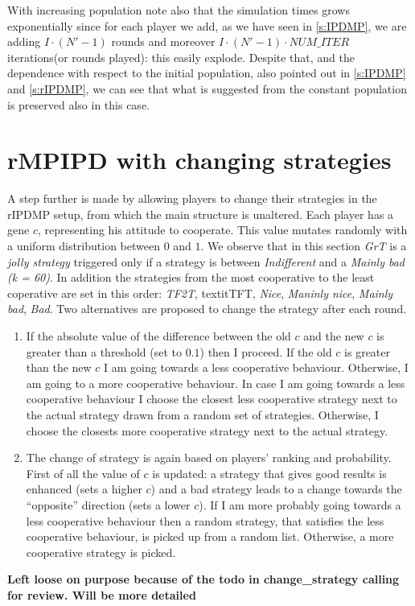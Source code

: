 \documentclass[journal,a4paper,10pt,twoside]{IEEEtran} %
\begin{document}
With increasing population note also that the simulation times grows exponentially since for each player we add, as we have seen in \autoref{s:IPDMP}, we are adding $I\cdot(N'-1)$ rounds and moreover $I\cdot(N'-1)\cdot{NUM\_ITER}$ iterations(or rounds played): this easily explode. Despite that, and the dependence with respect to the initial population, also pointed out in \autoref{s:IPDMP} and \autoref{s:rIPDMP}, we can see that what is suggested from the constant population is preserved also in this case.

\section{rMPIPD with changing strategies} \label{s:crIPDMP}
A step further is made by allowing players to change their strategies in the rIPDMP setup, from which the main structure is unaltered.
Each player has a gene $c$, representing his attitude to cooperate. This value mutates randomly with a uniform distribution between $0$ and $1$.
We observe that in this section \textit{GrT} is a \textit{jolly strategy} triggered only if a strategy is between \textit{Indifferent} and a \textit{Mainly bad (k = 60)}. In addition the strategies from the most cooperative to the least coperative are set in this order: \textit{TF2T}, textit{TFT}, \textit{Nice}, \textit{Maninly nice}, \textit{Mainly bad}, \textit{Bad}.
Two alternatives are proposed to change the strategy after each round.
\begin{enumerate}
    \item If the absolute value of the difference between the old $c$ and the new $c$ is greater than a threshold (set to $0.1$) then I proceed. If the old $c$ is greater than the new $c$ I am going towards a less cooperative behaviour. Otherwise, I am going to a more cooperative behaviour. 
    In case I am going towards a less cooperative behaviour I choose the closest less cooperative strategy next to the actual strategy drawn from a random set of strategies. Otherwise, I choose the closests more cooperative strategy next to the actual strategy.

    \item The change of strategy is again based on players' ranking and probability. First of all the value of $c$ is updated: a strategy that gives good results is enhanced (sets a higher $c$) and a bad strategy leads to a change towards the ``opposite'' direction (sets a lower $c$). If I am more probably going towards a less cooperative behaviour then a random strategy, that satisfies the less cooperative behaviour, is picked up from a random list. Otherwise, a more cooperative strategy is picked.
\end{enumerate}
\textbf{Left loose on purpose because of the todo in change_strategy calling for review. Will be more detailed}
\end{document}
